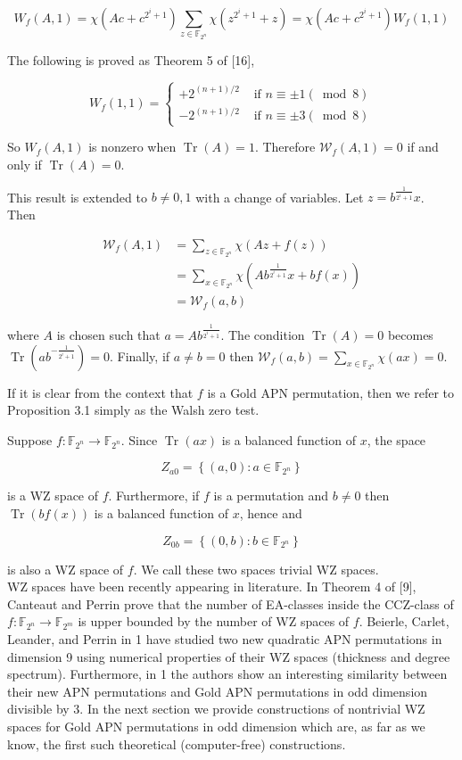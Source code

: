 \documentclass[10pt]{article}
\begin{document}
$$
W_{f}(A, 1)=\chi\left(A c+c^{2^{i}+1}\right) \sum_{z \in \mathbb{F}_{2^{n}}} \chi\left(z^{2^{i}+1}+z\right)=\chi\left(A c+c^{2^{i}+1}\right) W_{f}(1,1)
$$

The following is proved as Theorem 5 of [16],

$$
W_{f}(1,1)= \begin{cases}+2^{(n+1) / 2} & \text { if } n \equiv \pm 1(\bmod 8) \\ -2^{(n+1) / 2} & \text { if } n \equiv \pm 3(\bmod 8)\end{cases}
$$

So $W_{f}(A, 1)$ is nonzero when $\operatorname{Tr}(A)=1$. Therefore $\mathcal{W}_{f}(A, 1)=0$ if and only if $\operatorname{Tr}(A)=0$.

This result is extended to $b \neq 0,1$ with a change of variables. Let $z=b^{\frac{1}{2^{i}+1}} x$. Then

$$
\begin{aligned}
\mathcal{W}_{f}(A, 1) & =\sum_{z \in \mathbb{F}_{2^{n}}} \chi(A z+f(z)) \\
& =\sum_{x \in \mathbb{F}_{2^{n}}} \chi\left(A b^{\frac{1}{2^{i}+1}} x+b f(x)\right) \\
& =\mathcal{W}_{f}(a, b)
\end{aligned}
$$

where $A$ is chosen such that $a=A b^{\frac{1}{2^{i}+1}}$. The condition $\operatorname{Tr}(A)=0$ becomes $\operatorname{Tr}\left(a b^{-\frac{1}{2^{i}+1}}\right)=0$. Finally, if $a \neq b=0$ then $\mathcal{W}_{f}(a, b)=\sum_{x \in \mathbb{F}_{2^{n}}} \chi(a x)=0$.

If it is clear from the context that $f$ is a Gold APN permutation, then we refer to Proposition 3.1 simply as the Walsh zero test.

Suppose $f: \mathbb{F}_{2^{n}} \rightarrow \mathbb{F}_{2^{n}}$. Since $\operatorname{Tr}(a x)$ is a balanced function of $x$, the space

$$
Z_{a 0}=\left\{(a, 0): a \in \mathbb{F}_{2^{n}}\right\}
$$

is a WZ space of $f$. Furthermore, if $f$ is a permutation and $b \neq 0$ then $\operatorname{Tr}(b f(x))$ is a balanced function of $x$, hence and

$$
Z_{0 b}=\left\{(0, b): b \in \mathbb{F}_{2^{n}}\right\}
$$

is also a WZ space of $f$. We call these two spaces trivial WZ spaces.\\[0pt]
WZ spaces have been recently appearing in literature. In Theorem 4 of [9], Canteaut and Perrin prove that the number of EA-classes inside the CCZ-class of $f: \mathbb{F}_{2^{n}} \rightarrow \mathbb{F}_{2^{m}}$ is upper bounded by the number of WZ spaces of $f$. Beierle, Carlet, Leander, and Perrin in 1 have studied two new quadratic APN permutations in dimension 9 using numerical properties of their WZ spaces (thickness and degree spectrum). Furthermore, in 1 the authors show an interesting similarity between their new APN permutations and Gold APN permutations in odd dimension divisible by 3. In the next section we provide constructions of nontrivial WZ spaces for Gold APN permutations in odd dimension which are, as far as we know, the first such theoretical (computer-free) constructions.
\end{document}

